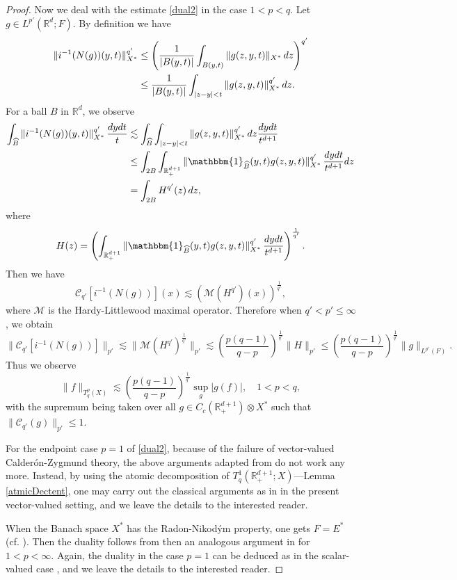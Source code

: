 \documentclass[oneside,english,a4wide]{amsart}
\numberwithin{equation}{section}
\numberwithin{figure}{section}
\theoremstyle{plain}
\theoremstyle{plain}
\theoremstyle{definition}
\theoremstyle{plain}
\theoremstyle{remark}
\theoremstyle{definition}
\theoremstyle{remark}
\theoremstyle{definition}
\newcommand{\real}{{\mathbb R}}
\newcommand{\M}{{\mathcal M}}
\newcommand{\8}{+\infty}
\renewcommand{\1}{\mathbbm{1}}
\newcommand{\wh}{\widehat}
\newcommand\sk[1]{ \left( #1 \right) }
\newcommand\mk[1]{ \left[ #1 \right] }
\renewcommand\d{{\rm d}}
\begin{document}
{\begin{proof}
\smallskip

Now we deal with the estimate \eqref{dual2} in the case $1 < p < q$. Let $g\in L^{p'}(\real^d; F)$. By definition we have
\[
\begin{aligned}
    \| i^{-1}(N(g))(y, t) \|_{X^*}^{q'} & \leq \sk{ \frac{1}{|B(y, t)|} \int_{B(y, t)}\| g(z, y, t) \|_{X^*} \,\d z }^{q'} \\
    & \leq \frac{1}{|B(y, t)|} \int_{|z - y|< t} \| g(z, y, t) \|_{X^*}^{q'} \,\d z.
\end{aligned}
\]
For a ball $B$ in $\real^d$, we observe
\[
\begin{aligned}
    \int_{\wh{B}}\| i^{-1}(N(g))(y, t) \|_{X^*}^{q'}\,\frac{\d y\d t}{t} & \lesssim \int_{\wh{B}} \int_{|z - y|< t }\| g(z, y, t) \|_{X^*}^{q'} \,\d z\frac{\d y\d t}{t^{d+1}} \\
    & \leq \int_{2B} \int_{\real^{d+1}_+} \| \1_{\wh{B}}(y, t)g(z, y, t) \|_{X^*}^{q'} \,\frac{\d y\d t}{t^{d+1}}\d z\\
    & = \int_{2B} H^{q'}(z)\,\d z,
\end{aligned}
\]
where
\[
    H(z) = \sk{ \int_{\real^{d+1}_+} \| \1_{\wh{B}}(y, t)g(z, y, t) \|_{X^*}^{q'} \,\frac{\d y\d t}{t^{d+1}} }^{\frac{1}{q'}}.
\]
Then we have
\[
    \mathcal{C}_{q'}\mk{ i^{-1}(N(g)) }(x) \lesssim \sk{ \M(H^{q'})(x) }^{\frac{1}{q'}}, 
\]
where $\M$ is the Hardy-Littlewood maximal operator. Therefore when $q' < p' \leq \infty$, we obtain
\[
    \| \mathcal{C}_{q'}\mk{ i^{-1}(N(g)) } \|_{p'} \lesssim \| \M(H^{q'})^{\frac{1}{q'}} \|_{p'} \lesssim \sk{\frac{p(q-1)}{q-p}}^{\frac{1}{q'}}\| H \|_{p'} \leq \sk{\frac{p(q-1)}{q-p}}^{\frac{1}{q'}}\| g \|_{L^{p'}(F)}.
\]
Thus we observe 
\[
    \| f \|_{T^p_q(X)} \lesssim \sk{\frac{p(q-1)}{q-p}}^{\frac{1}{q'}}\sup_{g}|g(f)|, \quad 1 < p < q,
\]
with the supremum being taken over all $g\in C_c(\real^{d+1}_+)\otimes X^*$ such that $\|\mathcal{C}_{q'}(g)\|_{p'} \leq 1$.

For the endpoint case $p=1$ of \eqref{dual2}, because of the failure of vector-valued Calder\'{o}n-Zygmund theory, the above arguments adapted from \cite[Theorem 2.4]{Harboure1991} do not work any more. Instead, by using {the atomic decomposition of $T^1_q(\real^{d+1}_+; X)$}---Lemma \ref{atmicDectent}, one may carry out the classical arguments as in \cite[Theorem 1]{Coifman1985} in the present vector-valued setting, and we leave the details to the interested reader. 

\smallskip

When the Banach space $X^*$ has the Radon-Nikod{\'y}m property, one gets $F = E^*$ (cf. \cite[Theorem 1.3.10]{Hytoenen2016}). Then the duality follows from then an analogous argument in \cite{Harboure1991} for $1 < p < \infty$. Again, the duality in the case $p=1$ can be deduced as in the scalar-valued case  \cite[Theorem 1]{Coifman1985}, and we leave the details to the interested reader.
\end{proof}

}
\end{document}
